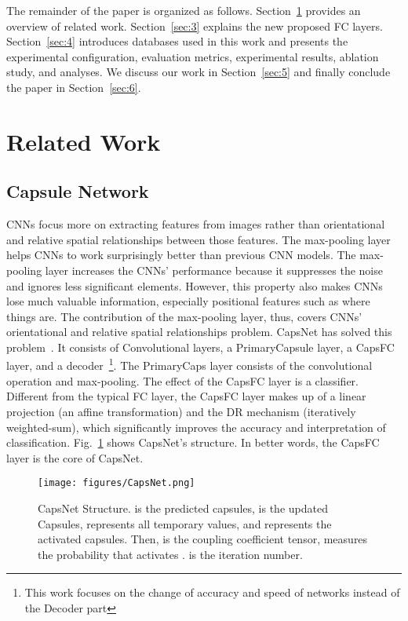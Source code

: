 \documentclass[sn-mathphys,iicol,Numbered]{sn-jnl}
\begin{document}
The remainder of the paper is organized as follows. Section~\ref{sec:2} provides an overview of related work. Section~\ref{sec:3} explains the new proposed FC layers. Section~\ref{sec:4} introduces databases used in this work and presents the experimental configuration, evaluation metrics, experimental results, ablation study, and analyses. We discuss our work in Section~\ref{sec:5} and finally conclude the paper in Section~\ref{sec:6}.

\section{Related Work} \label{sec:2}
\subsection{Capsule Network} \label{sec:2.1}

CNNs focus more on extracting features from images rather than orientational and relative spatial relationships between those features. The max-pooling layer helps CNNs to work surprisingly better than previous CNN models. The max-pooling layer increases the CNNs' performance because it suppresses the noise and ignores less significant elements. However, this property also makes CNNs lose much valuable information, especially positional features such as where things are. The contribution of the max-pooling layer, thus, covers CNNs' orientational and relative spatial relationships problem. CapsNet has solved this problem~\cite{A1_caps}. It consists of Convolutional layers, a PrimaryCapsule layer, a CapsFC layer, and a decoder~\footnote{This work focuses on the change of accuracy and speed of networks instead of the Decoder part}. The PrimaryCaps layer consists of the convolutional operation and max-pooling. The effect of the CapsFC layer is a classifier. Different from the typical FC layer, the CapsFC layer makes up of a linear projection (an affine transformation) and the DR mechanism (iteratively weighted-sum), which significantly improves the accuracy and interpretation of classification. Fig.~\ref{fig:capsnet} shows CapsNet's structure. In better words, the CapsFC layer is the core of CapsNet.

\begin{figure} [ht]
\centering
\caption{CapsNet Structure.  is the predicted capsules,  is the updated Capsules,  represents all temporary values, and  represents the activated capsules. Then,  is the coupling coefficient tensor,  measures the probability that  activates .  is the iteration number.}
\vspace{0.2cm}
\texttt{[image: figures/CapsNet.png]}
\label{fig:capsnet}
\vspace{-0.3cm}
\end{figure}
\end{document}
